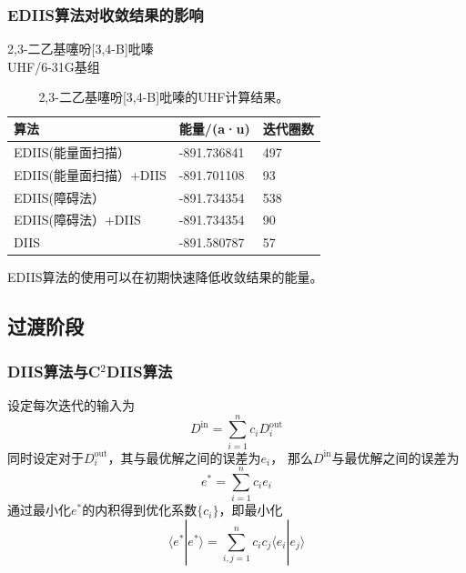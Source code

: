 \documentclass[10pt,aspectratio=43,mathserif,UTF8]{beamer}
\begin{document}
\begin{frame}
	\frametitle{EDIIS算法对收敛结果的影响}
	2,3-二乙基噻吩[3,4-B]吡嗪\\
	UHF/6-31G基组
	\begin{table}[htbp]
		\caption{2,3-二乙基噻吩[3,4-B]吡嗪的UHF计算结果。}\label{table:AA4}
		\setlength{\belowcaptionskip}{7pt}
		\centering
		\begin{tabular}{l l l}
			\toprule
			\textbf{算法} & \textbf{能量/(a·u)} & \textbf{迭代圈数}\\
			\midrule
			EDIIS(能量面扫描）         &-891.736841       &     497\\
			EDIIS(能量面扫描）+DIIS    &-891.701108      &     93\\
			EDIIS(障碍法）             & -891.734354      &      538\\
			EDIIS(障碍法）+DIIS        & -891.734354      &     90\\
			DIIS                      & -891.580787      &     57\\
			\bottomrule
		\end{tabular}
		\vspace{0.2cm}
	\end{table}
	\centerline{EDIIS算法的使用可以在初期快速降低收敛结果的能量。}
\end{frame}

\subsection{过渡阶段}
\begin{frame}
	\frametitle{DIIS算法与C$^2$DIIS算法}
	设定每次迭代的输入为
	\begin{equation}
		D^{\text{in}} = \sum_{i=1}^{n} c_i D_i^{\text{out}}
	\end{equation}
	同时设定对于$D_i^{\text{out}}$，其与最优解之间的误差为$e_i$，
	那么$D^{\text{in}}$与最优解之间的误差为
	\begin{equation}
		e^{*} = \sum_{i=1}^{n} c_i e_i
	\end{equation}
	通过最小化$e^{*}$的内积得到优化系数$\{c_i\}$，即最小化
	\begin{equation}
		\langle  e^{*} |  e^{*}  \rangle = \sum_{i,j=1}^{n} c_i c_j\langle  e_{i} |  e_{j}  \rangle
	\end{equation}
\end{frame}
\end{document}
